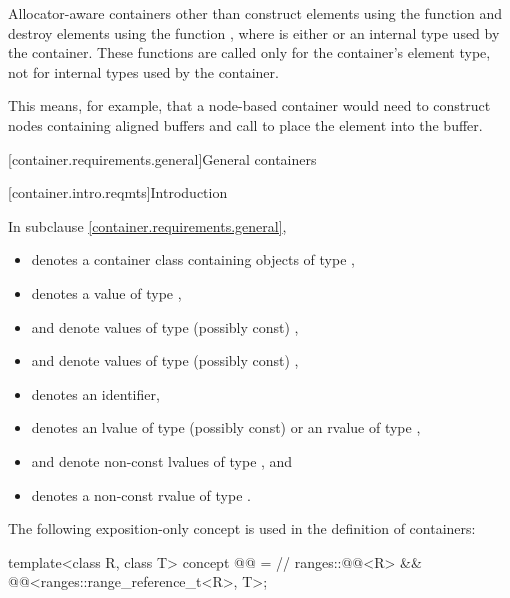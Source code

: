 \pnum
Allocator-aware containers
other than  construct elements using the function
and destroy elements using the function
,
where  is either  or
an internal type used by the container.
These functions are called only for the
container's element type, not for internal types used by the container.
\begin{note}
This
means, for example, that a node-based container would need to construct nodes containing
aligned buffers and call  to place the element into the buffer.
\end{note}

[container.requirements.general]{General containers}

[container.intro.reqmts]{Introduction}

\pnum
In subclause \ref{container.requirements.general},
\begin{itemize}
\item
{} denotes a container class containing objects of type ,
\item
{} denotes a value of type ,
\item
{} and  denote values of type (possibly const) ,
\item
{} and  denote values of type (possibly const) ,
\item
{} denotes an identifier,
\item
{} denotes an lvalue of type (possibly const)  or
an rvalue of type ,
\item
{} and  denote non-const lvalues of type , and
\item
{} denotes a non-const rvalue of type .
\end{itemize}

\pnum
The following exposition-only concept is used in the definition of containers:
\begin{codeblock}
template<class R, class T>
concept @@ =    // \expos
  ranges::@@<R> && @@<ranges::range_reference_t<R>, T>;
\end{codeblock}

